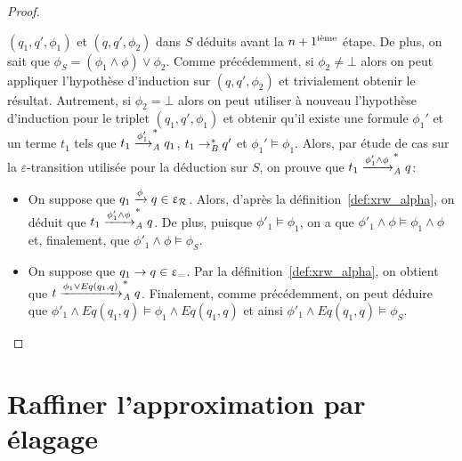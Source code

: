 \begin{proof}
\begin{itemize}
\begin{itemize}
    $(q_1,q',\phi_1)$ et $(q,q',\phi_2)$ dans $S$ déduits avant la $n+1^\iem$
    étape. De plus, on sait que $\phi_S=(\phi_1 \wedge \phi) \vee \phi_2$.
    Comme précédemment, si $\phi_2 \neq \bot$ alors on peut appliquer l'hypothèse d'induction
    sur $(q,q',\phi_2)$ et trivialement obtenir le résultat. Autrement, si $\phi_2=\bot$
    alors on peut utiliser à nouveau l'hypothèse d'induction pour le triplet $(q_1,q',\phi_1)$ et
    obtenir qu'il existe une formule $\phi_1'$ et un terme $t_1$ tels que
    $t_1\xrw{\phi_1'}_\A^* q_1$, $t_1 \rwB^* q'$ et $\phi_1' \models \phi_1$.
    Alors, par étude de cas sur la  $\varepsilon$-transition utilisée pour la déduction sur $S$, on 
    prouve que $t_1 \xrw{\phi_1'\wedge \phi}_\A^* q$:

    \begin{itemize}
    \item On suppose que $q_1 \xrw{\phi} q \in \Drw$. Alors, d'après la
      définition~\ref{def:xrw_alpha}, on déduit que $t_1 \xrw{\phi'_1
        \wedge \phi}_\A^* q$. De plus, puisque $\phi'_1 \models \phi_1$, on a que
      $\phi'_1 \wedge \phi \models \phi_1 \wedge \phi$ et, finalement, que
      $\phi'_1 \wedge \phi \models \phi_S$.

    \item On suppose que $q_1 \rw q \in \Deq$. Par
      la définition~\ref{def:xrw_alpha}, on obtient que $t \xrw{\phi_1 \lor Eq(q_1, q)}_\A^* q$.
      Finalement, comme précédemment, on peut déduire que
      $\phi'_1 \wedge Eq(q_1,q) \models \phi_1 \wedge Eq(q_1,q)$ et ainsi $\phi'_1 \wedge
      Eq(q_1,q) \models \phi_S$.
    \end{itemize}
  \end{itemize}
\end{itemize}
\end{proof}


\section{Raffiner l'approximation par élagage}
\label{sec:refinement}


